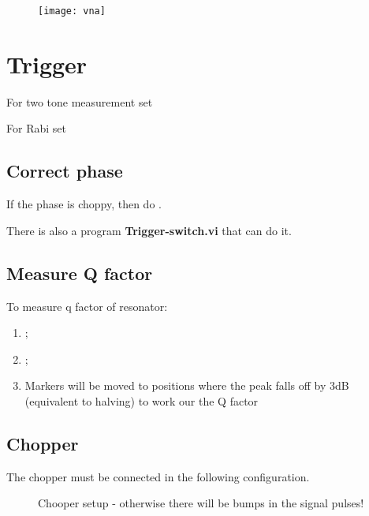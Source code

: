  \begin{figure}[h]
   \texttt{[image: vna]}
 \end{figure}

 \section{Trigger}
 \label{sec:trigger}

 For two tone measurement set 

 For Rabi set 

 \subsection{Correct phase}
 \label{sec:correct-phase}

 If  the  phase   is  choppy,  then  do   .

 \begin{framed}\noindent
   There is also a program \textbf{Trigger-switch.vi} that can do it.
 \end{framed}

 \subsection{Measure Q factor}
 \label{sec:measure-q-factor}

 To measure q factor of resonator:
 \begin{enumerate}
 \item {};
 \item {}
   ;
 \item  Markers will  be moved  to positions  where the  peak falls  off by  3dB
   (equivalent to halving) to work our the Q factor
 \end{enumerate}

 \subsection{Chopper}
 \label{sec:chopper}

 The chopper must be connected in the following configuration.

\begin{figure}[h]
  \centering {}
  \caption{\small Chooper  setup - otherwise there  will be bumps in  the signal
    pulses!\label{fig:chopper_setup}}
\end{figure}


\newpage
